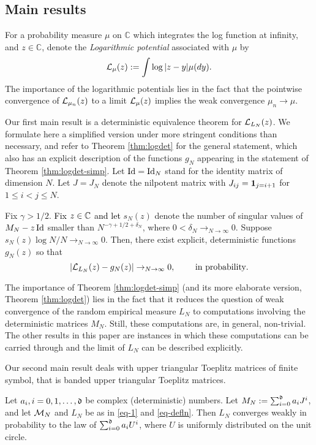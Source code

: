 \documentclass{amsart}
\numberwithin{equation}{section}
\def\corEE{\textcolor{amethyst}}
\def\corEE{}
\def\corAB{}
\def\corABrev{\textcolor{black}}
\begin{document}
\subsection{Main results}
 For a
probability measure $\mu$ on $\mathbb{C}$ which integrates the
log function at infinity, and $z\in \mathbb{C}$,
denote the \textit{Logarithmic potential} associated with $\mu$ by
\begin{equation}
  \label{eq-logpot}
  \mathcal{L}_\mu(z):=\int \log|z-y|
\mu(dy).
\end{equation}
The importance of the logarithmic potentials lies in the
fact that the pointwise convergence of $\mathcal{L}_{\mu_n}(z)$ to a limit $\mathcal{L}_\mu(z)$
implies the
weak convergence $\mu_n\to\mu$.

Our first main result is a deterministic equivalence theorem for
$\mathcal{L}_{L_N}(z)$.
We formulate here a simplified version under more stringent
conditions than necessary, and refer to Theorem  \ref{thm:logdet}
for the general statement,
which also has an explicit description
of the functions $g_N$ appearing in the statement of Theorem \ref{thm:logdet-simp}. \corEE{Let $\operatorname{Id} = \operatorname{Id}_N$ stand for
the identity matrix of dimension $N$.
Let $J=J_N$ denote the nilpotent matrix with $J_{ij}={\bf 1}_{j=i+1}$
for $1 \leq i < j \leq N$.}
\begin{theorem}
  \label{thm:logdet-simp}
 Fix $\gamma>1/2$. \corABrev{Fix $z \in \mathbb{C}$ and
 let} $\corAB{s_N(z)}$ denote the number of singular
 values of $M_N-z\operatorname{Id}$ smaller than $N^{-\gamma+1/2+\delta_N}$, where
 $0<\delta_N\to_{N\to\infty} 0$. 
 Suppose
 $\corAB{s_N(z)}\log N/ N\to_{N\to \infty} 0$.
 Then, there exist explicit, deterministic functions $g_N(z)$ so that
 \[
 |\LL_{L_N}(z)- g_N(z)|\to_{N\to\infty} 0, \qquad \text{ \corABrev{in probability}}.\]
 \end{theorem}
 The importance of Theorem \ref{thm:logdet-simp} (and its more elaborate
 version, Theorem \ref{thm:logdet}) lies in the fact that it reduces
 the question of weak convergence of the random empirical measure $L_N$
 to computations involving the deterministic matrices $M_N$. Still,
 these computations are, in general, non-trivial. The other results in
 this paper are instances in which these computations can be carried through
 and the limit of $L_N$ can be described explicitly.



Our second main result deals with upper triangular Toeplitz matrices
of finite symbol, that is banded upper triangular Toeplitz matrices.
\begin{theorem}
  \label{theo-1}
  Let $a_i, i=0,1,\ldots,\mathfrak{d}$ be complex (deterministic) numbers.  Let
  $M_N:=\sum_{i=0}^{\mathfrak{d}} a_i J^i$, and let $\mathcal{M}_N$ and $L_N$
  be as in \eqref{eq-1} and \eqref{eq-defln}.
  Then $L_N$ converges weakly in probability to the law of $\sum_{i=0}^{\mathfrak{d}}
  a_i U^i$, where $U$ is uniformly distributed on the unit circle.
\end{theorem}
\end{document}
